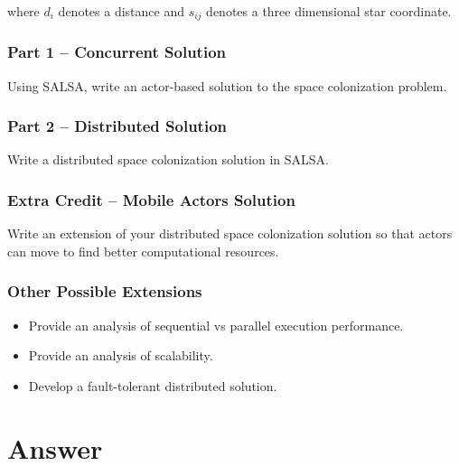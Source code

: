 \documentclass[12pt,letterpaper]{article}
\begin{document}
where $d_i$ denotes a distance and $s_{ij}$ denotes a three dimensional star coordinate. 

\section*{Part 1 -- Concurrent Solution}
Using SALSA, write an actor-based solution to the space colonization problem.

\section*{Part 2 -- Distributed Solution}
Write a distributed space colonization solution in SALSA.

\section*{Extra Credit -- Mobile Actors Solution}
Write an extension of your distributed space colonization solution so that actors can move to find better computational resources. 

\section*{Other Possible Extensions}
\begin{itemize}
\item Provide an analysis of sequential vs parallel execution performance.
\item Provide an analysis of scalability.
\item Develop a fault-tolerant distributed solution.
\end{itemize}

\part*{Answer}
\end{document}
